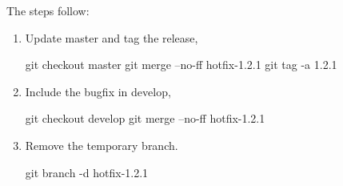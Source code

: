 The steps follow:
\begin{enumerate}
	\item Update master and tag the release,
\begin{git-bash}
    git checkout master
    git merge --no-ff hotfix-1.2.1
    git tag -a 1.2.1
\end{git-bash}
	
	\item Include the bugfix in develop,
\begin{git-bash}
    git checkout develop
    git merge --no-ff hotfix-1.2.1
\end{git-bash}

	\item Remove the temporary branch.
\begin{git-bash}
    git branch -d hotfix-1.2.1
\end{git-bash}
\end{enumerate}














